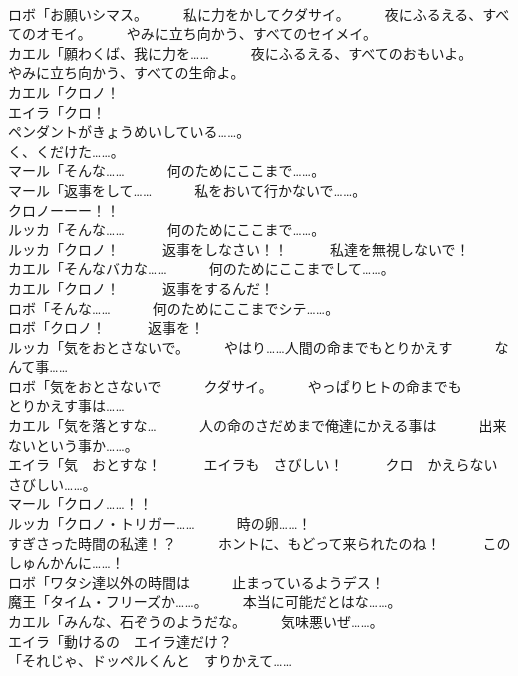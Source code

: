 \documentclass[8pt]{extreport}
\begin{document}
\begin{CJK}{UTF8}{min}
\\	ロボ「お願いシマス。　　　私に力をかしてクダサイ。　　　夜にふるえる、すべてのオモイ。　　　やみに立ち向かう、すべてのセイメイ。	
\\	カエル「願わくば、我に力を……　　　夜にふるえる、すべてのおもいよ。　　　やみに立ち向かう、すべての生命よ。	
\\	カエル「クロノ！	
\\	エイラ「クロ！	
\\	ペンダントがきょうめいしている……。	
\\	く、くだけた……。	
\\	マール「そんな……　　　何のためにここまで……。	
\\	マール「返事をして……　　　私をおいて行かないで……。	
\\	クロノーーー！！	
\\	ルッカ「そんな……　　　何のためにここまで……。	
\\	ルッカ「クロノ！　　　返事をしなさい！！　　　私達を無視しないで！	
\\	カエル「そんなバカな……　　　何のためにここまでして……。	
\\	カエル「クロノ！　　　返事をするんだ！	
\\	ロボ「そんな……　　　何のためにここまでシテ……。	
\\	ロボ「クロノ！　　　返事を！	
\\	ルッカ「気をおとさないで。　　　やはり……人間の命までもとりかえす　　　なんて事……	
\\	ロボ「気をおとさないで　　　クダサイ。　　　やっぱりヒトの命までも　　　とりかえす事は……	
\\	カエル「気を落とすな…　　　人の命のさだめまで俺達にかえる事は　　　出来ないという事か……。	
\\	エイラ「気　おとすな！　　　エイラも　さびしい！　　　クロ　かえらない　さびしい……。	
\\	マール「クロノ……！！	
\\	ルッカ「クロノ・トリガー……　　　時の卵……！	
\\	すぎさった時間の私達！？　　　ホントに、もどって来られたのね！　　　このしゅんかんに……！	
\\	ロボ「ワタシ達以外の時間は　　　止まっているようデス！	
\\	魔王「タイム・フリーズか……。　　　本当に可能だとはな……。	
\\	カエル「みんな、石ぞうのようだな。　　　気味悪いぜ……。	
\\	エイラ「動けるの　エイラ達だけ？ 
\\	「それじゃ、ドッペルくんと　すりかえて……	

\end{CJK}
\end{document}
